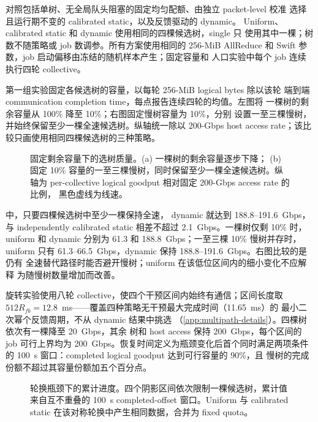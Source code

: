 对照包括单树、无全局队头阻塞的固定均匀配额、由独立 packet-level 校准
选择且运行期不变的 calibrated static，以及反馈驱动的 dynamic。
Uniform、calibrated static 和 dynamic 使用相同的四棵候选树，single 只
使用其中一棵；树数不随策略或 job 数调参。所有方案使用相同的 256-MiB
AllReduce 和 Swift 参数，job 启动偏移由冻结的随机样本产生；固定容量和
人口实验中每个 job 连续执行四轮 collective。

第一组实验固定各候选树的容量，以每轮 256-MiB logical bytes 除以该轮
端到端 communication completion time，每点报告连续四轮的均值。左图将
一棵树的剩余容量从 100\% 降至 10\%；右图固定慢树容量为 10\%，分别
设置一至三棵慢树，并始终保留至少一棵全速候选树。纵轴统一除以
200-Gbps host access rate；该比较只画使用相同四棵候选树的三种策略。

\begin{figure}[t]
\centering

\caption{固定剩余容量下的选树质量。(a) 一棵树的剩余容量逐步下降；
(b) 固定 10\% 容量的一至三棵慢树，同时保留至少一棵全速候选树。纵轴为
per-collective logical goodput 相对固定 200-Gbps access rate 的比例，
黑色虚线为线速。}
\label{fig:multipath-residual}
\end{figure}

 中，只要四棵候选树中至少一棵保持全速，
dynamic 就达到 188.8--191.6~Gbps，与 independently calibrated static
相差不超过 2.1~Gbps。一棵树仅剩 10\% 时，uniform 和 dynamic 分别为
61.3 和 188.8~Gbps；一至三棵 10\% 慢树并存时，uniform 只有
61.3--66.5~Gbps，dynamic 保持 188.8--191.6~Gbps。右图比较的是仍有
全速替代路径时能否避开慢树；uniform 在该低位区间内的细小变化不应解释
为随慢树数量增加而改善。

旋转实验使用八轮 collective，使四个干预区间内始终有通信；区间长度取
$512R_{fb}=12.8$~ms——覆盖四种策略无干预最大完成时间（11.65~ms）的
最小二次幂个反馈周期，不从 dynamic 结果中挑选
（\cref{app:multipath-details}）。四棵树依次有一棵降至 20~Gbps，其余
树和 host access 保持 200~Gbps，每个区间的 job 可行上界均为
200~Gbps。恢复时间定义为瓶颈变化后首个同时满足两项条件的
100~\textmu s 窗口：completed logical goodput 达到可行容量的 90\%，且
慢树的完成份额不超过其容量份额加五个百分点。

\begin{figure}[t]
\centering

\caption{轮换瓶颈下的累计进度。四个阴影区间依次限制一棵候选树，累计值
来自互不重叠的 100~\textmu s completed-offset 窗口。Uniform 与
calibrated static 在该对称轮换中产生相同数据，合并为 fixed quota。}
\label{fig:multipath-rotation}
\end{figure}

